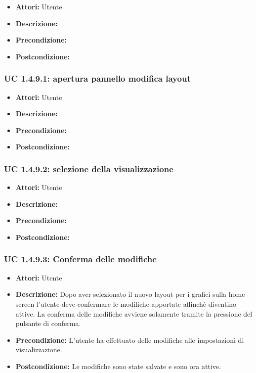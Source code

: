 \begin{itemize}
\item \textbf{Attori:} Utente
\item \textbf{Descrizione:} 
\item \textbf{Precondizione:} 
\item \textbf{Postcondizione:} 
\end{itemize}

\subsubsection{UC 1.4.9.1: apertura pannello modifica layout}

\begin{itemize}
\item \textbf{Attori:} Utente
\item \textbf{Descrizione:} 
\item \textbf{Precondizione:} 
\item \textbf{Postcondizione:} 
\end{itemize}

\subsubsection{UC 1.4.9.2: selezione della visualizzazione}

\begin{itemize}
\item \textbf{Attori:} Utente
\item \textbf{Descrizione:} 
\item \textbf{Precondizione:} 
\item \textbf{Postcondizione:} 
\end{itemize}

\subsubsection{UC 1.4.9.3: Conferma delle modifiche}

\begin{itemize}
\item \textbf{Attori:} Utente
\item \textbf{Descrizione:} Dopo aver selezionato il nuovo layout per i grafici sulla home screen l'utente deve confermare le modifiche apportate affinchè diventino attive. La conferma delle modifiche avviene solamente tramite la pressione del pulsante di conferma.
\item \textbf{Precondizione:} L'utente ha effettuato delle modifiche alle impostazioni di visualizzazione.
\item \textbf{Postcondizione:} Le modifiche sono state salvate e sono ora attive.
\end{itemize}

